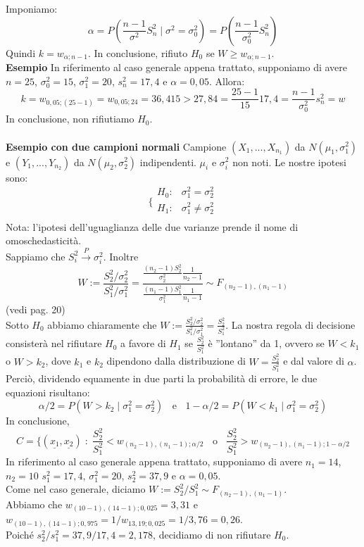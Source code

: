 Imponiamo:
$$\alpha = P \left( \frac{n-1}{\sigma^2} S_n^2 \mid \sigma^2=\sigma_0^2 \right) = P \left( \frac{n-1}{\sigma_0^2} S_n^2 \right)$$
Quindi $k=w_{\alpha;n-1}$. In conclusione, rifiuto $H_0$ se $W \geq w_{\alpha;n-1}$.\\
\textbf{Esempio} In riferimento al caso generale appena trattato, supponiamo di avere $n=25$, $\sigma_0^2=15$, $\sigma_1^2=20$, $s_n^2=17,4$ e $\alpha=0,05$. Allora:
$$k=w_{0,05;(25-1)} = w_{0,05;24} = 36,415 > 27,84 = \frac{25-1}{15} 17,4 = \frac{n-1}{\sigma_0^2} s_n^2 = w$$
In conclusione, non rifiutiamo $H_0$.\\
\\
\textbf{Esempio con due campioni normali} Campione $(X_1,...,X_{n_1})$ da $N(\mu_1,\sigma_1^2)$ e $(Y_1,...,Y_{n_2})$ da $N(\mu_2,\sigma_2^2)$ indipendenti. $\mu_i$ e $\sigma_i^2$ non noti. Le nostre ipotesi sono:
$$\bigg \{
\begin{array}{rl}
H_0: & \sigma_1^2=\sigma_2^2 \\
H_1: & \sigma_1^2 \neq \sigma_2^2 \\
\end{array}
$$
Nota: l'ipotesi dell'uguaglianza delle due varianze prende il nome di omoschedasticità.\\
Sappiamo che $S_i^2 \stackrel{P}{\rightarrow} \sigma_i^2$. Inoltre
$$W:= \frac{S_2^2 / \sigma_2^2}{S_1^2 / \sigma_1^2} = 
\frac{\frac{(n_2-1) S_2^2}{\sigma_2^2} \frac{1}{n_2-1}} {\frac{(n_1-1) S_1^2}{\sigma_1^2} \frac{1}{n_1-1}} 
\sim F_{(n_2-1),(n_1-1)}$$
(vedi pag. 20)\\
Sotto $H_0$ abbiamo chiaramente che $W:= \frac{S_2^2 / \sigma_2^2}{S_1^2 / \sigma_1^2} = \frac{S_2^2}{S_1^2}$. La nostra regola di decisione consisterà nel rifiutare $H_0$ a favore di $H_1$ se $\frac{S_2^2}{S_1^2}$ è ''lontano'' da 1, ovvero se $W<k_1$ o $W>k_2$, dove $k_1$ e $k_2$ dipendono dalla distribuzione di $W= \frac{S_2^2}{S_1^2}$ e dal valore di $\alpha$. Perciò, dividendo equamente in due parti la probabilità di errore, le due equazioni risultano:
$$\alpha/2 = P(W>k_2 \mid \sigma_1^2=\sigma_2^2) \; \; \text{ e } \; \; 1-\alpha/2 = P(W<k_1 \mid \sigma_1^2=\sigma_2^2)$$
In conclusione, 
$$C= \lbrace (\underline{x_1},\underline{x_2}) \; : \; \frac{S_2^2}{S_1^2} < w_{(n_2-1),(n_1-1);\alpha/2} \; \; \text{ o } \; \; \frac{S_2^2}{S_1^2} > w_{(n_2-1),(n_1-1);1-\alpha/2}$$
In riferimento al caso generale appena trattato, supponiamo di avere $n_1=14$, $n_2=10$ $s_1^2=17,4$, $\sigma_1^2=20$, $s_2^2=37,9$ e $\alpha=0,05$.\\
Come nel caso generale, diciamo $W:=S_2^2/S_1^2 \sim F_{(n_2-1),(n_1-1)}$.\\
Abbiamo che $w_{(10-1),(14-1);0,025}=3,31$ e $w_{(10-1),(14-1);0,975}=1/w_{13,19;0,025}=1/3,76=0,26$.\\
Poiché $s_2^2/s_1^2=37,9/17,4=2,178$, decidiamo di non rifiutare $H_0$.